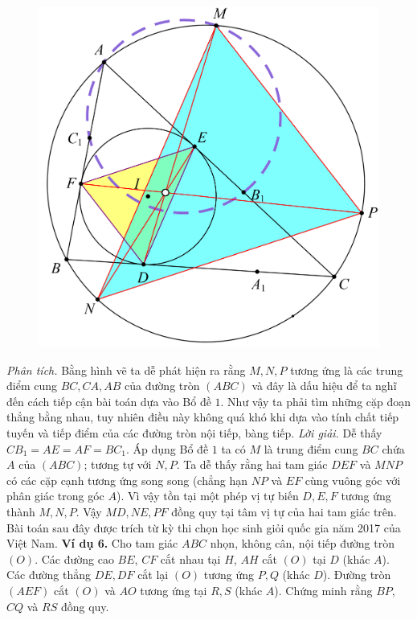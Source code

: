 \begin{multicols}{2}
\begin{figure}[H]
		\vspace*{-5pt}
		\centering
		\captionsetup{labelformat= empty, justification=centering}
		\includegraphics[width= 0.9\linewidth]{11}
		\vspace*{-10pt}
	\end{figure}
	\textit{Phân tích.} Bằng hình vẽ ta dễ phát hiện ra rằng $M,N,P$ tương ứng là các trung điểm cung $BC,CA,AB$ của đường tròn $(ABC)$ và đây là dấu hiệu để ta nghĩ đến cách tiếp cận bài toán dựa vào Bổ đề $1$. Như vậy ta phải tìm những cặp đoạn thẳng bằng nhau, tuy nhiên điều này không quá khó khi dựa vào tính chất tiếp tuyến và tiếp điểm của các đường tròn nội tiếp, bàng tiếp.
	\vskip 0.1cm
	\textit{Lời giải.} Dễ thấy $CB_1 =AE=AF=BC_1$. Áp dụng Bổ đề $1$ ta có $M$ là trung điểm cung $BC$ chứa $A$ của $(ABC)$; tương tự với $N,P.$ Ta dễ thấy rằng hai tam giác $DEF$ và $MNP$ có các cặp cạnh tương ứng song song (chẳng hạn $NP$ và $EF$ cùng vuông góc với phân giác trong góc $A$). Vì vậy tồn tại một phép vị tự biến $D,E,F$ tương ứng thành $M,N,P$. Vậy $MD,NE,PF$ đồng quy tại tâm vị tự của hai tam giác trên. 
	\vskip 0.1cm
	Bài toán sau đây được trích từ kỳ thi chọn học sinh giỏi quốc gia năm 2017 của Việt Nam.
	\textbf{\color{diendantoanhoc}Ví dụ 6.} Cho tam giác $ABC$ nhọn, không cân, nội tiếp đường tròn $(O)$. Các đường cao $BE$, $CF$ cắt nhau tại $H$, $AH$ cắt $(O)$ tại $D$  (khác $A$). Các đường thẳng $DE,DF$ cắt lại $(O)$ tương ứng  $P,Q$ (khác $D$). Đường tròn $(AEF)$ cắt $(O)$ và $AO$ tương ứng tại $R,S$ (khác $A$). Chứng minh rằng $BP$, $CQ$ và $RS$ đồng quy.

\end{multicols}
